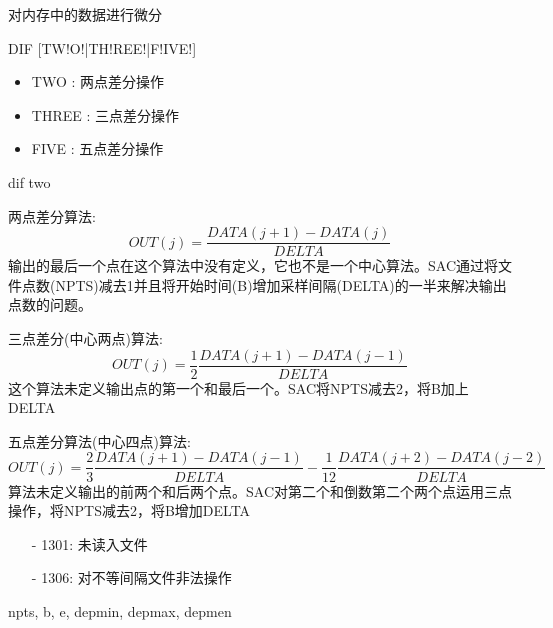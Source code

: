 \label{cmd:dif}

对内存中的数据进行微分

\begin{SACSTX}
DIF [TW!O!|TH!REE!|F!IVE!]
\end{SACSTX}

\begin{itemize}
\item TWO : 两点差分操作
\item THREE : 三点差分操作
\item FIVE : 五点差分操作
\end{itemize}

\begin{SACDFT}
dif two
\end{SACDFT}

两点差分算法:
\[ OUT(j) =\frac{DATA(j+1) -DATA(j)}{DELTA} \]
输出的最后一个点在这个算法中没有定义，它也不是一个中心算法。SAC通过将文件点数(NPTS)减去1并且将开始时间(B)增加采样间隔(DELTA)的一半来解决输出点数的问题。 

三点差分(中心两点)算法:
\[ OUT(j) = \frac{1}{2} \frac{DATA(j+1) -DATA(j-1)}{DELTA} \]
这个算法未定义输出点的第一个和最后一个。SAC将NPTS减去2，将B加上DELTA

五点差分算法(中心四点)算法:
\[ OUT(j) = \frac{2}{3} \frac{DATA(j+1) -DATA(j-1)}{DELTA} - \frac{1}{12} \frac{DATA(j+2) -DATA(j-2)}{DELTA} \]
算法未定义输出的前两个和后两个点。SAC对第二个和倒数第二个两个点运用三点操作，将NPTS减去2，将B增加DELTA

\begin{itemize}
\item[-]1301: 未读入文件
\item[-]1306: 对不等间隔文件非法操作
\end{itemize}

npts, b, e, depmin, depmax, depmen
